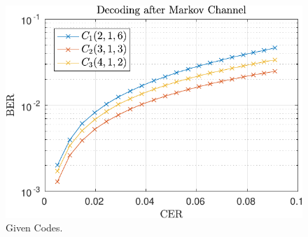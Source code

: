 \begin{figure}
\centering
\includegraphics[scale=1]{../figures/qimarkov.pdf} 
\caption{Given Codes.\label{fig:givenMarkovFigure}}
\end{figure}
